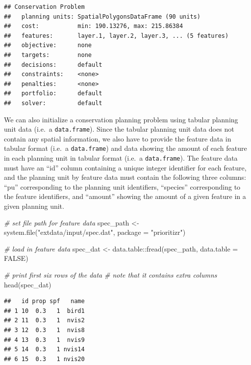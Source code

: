 \documentclass[
  12pt,
]{book}
\newenvironment{Shaded}{\begin{snugshade}}{\end{snugshade}}
\newcommand{\AttributeTok}[1]{\textcolor[rgb]{0.77,0.63,0.00}{#1}}
\newcommand{\CommentTok}[1]{\textcolor[rgb]{0.56,0.35,0.01}{\textit{#1}}}
\newcommand{\ConstantTok}[1]{\textcolor[rgb]{0.00,0.00,0.00}{#1}}
\newcommand{\FunctionTok}[1]{\textcolor[rgb]{0.00,0.00,0.00}{#1}}
\newcommand{\NormalTok}[1]{#1}
\newcommand{\OtherTok}[1]{\textcolor[rgb]{0.56,0.35,0.01}{#1}}
\newcommand{\SpecialCharTok}[1]{\textcolor[rgb]{0.00,0.00,0.00}{#1}}
\newcommand{\StringTok}[1]{\textcolor[rgb]{0.31,0.60,0.02}{#1}}
\begin{document}
\begin{verbatim}
## Conservation Problem
##   planning units: SpatialPolygonsDataFrame (90 units)
##   cost:           min: 190.13276, max: 215.86384
##   features:       layer.1, layer.2, layer.3, ... (5 features)
##   objective:      none
##   targets:        none
##   decisions:      default
##   constraints:    <none>
##   penalties:      <none>
##   portfolio:      default
##   solver:         default
\end{verbatim}

We can also initialize a conservation planning problem using tabular planning unit data (i.e.~a \texttt{data.frame}). Since the tabular planning unit data does not contain any spatial information, we also have to provide the feature data in tabular format (i.e.~a \texttt{data.frame}) and data showing the amount of each feature in each planning unit in tabular format (i.e.~a \texttt{data.frame}). The feature data must have an ``id'' column containing a unique integer identifier for each feature, and the planning unit by feature data must contain the following three columns: ``pu'' corresponding to the planning unit identifiers, ``species'' corresponding to the feature identifiers, and ``amount'' showing the amount of a given feature in a given planning unit.

\begin{Shaded}
\begin{Highlighting}[]
\CommentTok{\# set file path for feature data}
\NormalTok{spec\_path }\OtherTok{\textless{}{-}} \FunctionTok{system.file}\NormalTok{(}\StringTok{"extdata/input/spec.dat"}\NormalTok{, }\AttributeTok{package =} \StringTok{"prioritizr"}\NormalTok{)}

\CommentTok{\# load in feature data}
\NormalTok{spec\_dat }\OtherTok{\textless{}{-}}\NormalTok{ data.table}\SpecialCharTok{::}\FunctionTok{fread}\NormalTok{(spec\_path, }\AttributeTok{data.table =} \ConstantTok{FALSE}\NormalTok{)}

\CommentTok{\# print first six rows of the data}
\CommentTok{\# note that it contains extra columns}
\FunctionTok{head}\NormalTok{(spec\_dat)}
\end{Highlighting}
\end{Shaded}

\begin{verbatim}
##   id prop spf   name
## 1 10  0.3   1  bird1
## 2 11  0.3   1  nvis2
## 3 12  0.3   1  nvis8
## 4 13  0.3   1  nvis9
## 5 14  0.3   1 nvis14
## 6 15  0.3   1 nvis20
\end{verbatim}
\end{document}
